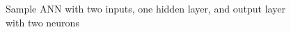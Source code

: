 \begin{figure}
    \centerline{}
    \caption{Sample ANN with two inputs, one hidden layer, and output layer with two neurons \cite{babu2000adaptive} }
    \label{figure:simple-ann}
\end{figure}